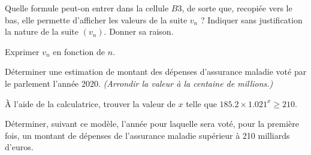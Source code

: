 \begin{questions}
	\question Quelle formule peut-on entrer dans la cellule $B3$, de sorte que, recopiée vers le bas, elle permette d'afficher les valeurs de la suite $v_n$ ?
	\question Indiquer sans justification la nature de la suite $(v_n)$. Donner sa raison.
	
	\question Exprimer $v_n$ en fonction de $n$.
	
	\question Déterminer une estimation de montant des dépenses d'assurance maladie voté par le parlement l'année 2020. \emph{(Arrondir la valeur à la centaine de millions.)}
	
	\question \`A l'aide de la calculatrice, trouver la valeur de $x$ telle que $\num{185.2} \times \num{1.021}^x \ge \num{210}$.
	
	\question Déterminer, suivant ce modèle, l'année pour laquelle sera voté, pour la première fois, un montant de dépenses de l'assurance maladie supérieur à 210 milliards d'euros. 
\end{questions}